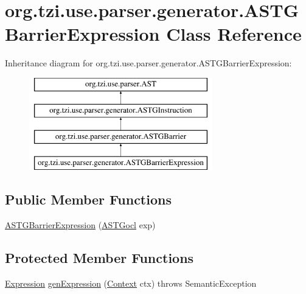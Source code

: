 \hypertarget{classorg_1_1tzi_1_1use_1_1parser_1_1generator_1_1_a_s_t_g_barrier_expression}{\section{org.\-tzi.\-use.\-parser.\-generator.\-A\-S\-T\-G\-Barrier\-Expression Class Reference}
\label{classorg_1_1tzi_1_1use_1_1parser_1_1generator_1_1_a_s_t_g_barrier_expression}
}
Inheritance diagram for org.\-tzi.\-use.\-parser.\-generator.\-A\-S\-T\-G\-Barrier\-Expression\-:\begin{figure}[H]
\begin{center}
\leavevmode
\includegraphics[height=4.000000cm]{classorg_1_1tzi_1_1use_1_1parser_1_1generator_1_1_a_s_t_g_barrier_expression}
\end{center}
\end{figure}
\subsection*{Public Member Functions}
\begin{DoxyCompactItemize}
\item 
\hyperlink{classorg_1_1tzi_1_1use_1_1parser_1_1generator_1_1_a_s_t_g_barrier_expression_a4e6dd1d7afd38f58ccb8c5a39e8d5ab7}{A\-S\-T\-G\-Barrier\-Expression} (\hyperlink{classorg_1_1tzi_1_1use_1_1parser_1_1generator_1_1_a_s_t_gocl}{A\-S\-T\-Gocl} exp)
\end{DoxyCompactItemize}
\subsection*{Protected Member Functions}
\begin{DoxyCompactItemize}
\item 
\hyperlink{classorg_1_1tzi_1_1use_1_1uml_1_1ocl_1_1expr_1_1_expression}{Expression} \hyperlink{classorg_1_1tzi_1_1use_1_1parser_1_1generator_1_1_a_s_t_g_barrier_expression_a277fa85de5eb09d031f22a6750074c11}{gen\-Expression} (\hyperlink{classorg_1_1tzi_1_1use_1_1parser_1_1_context}{Context} ctx)  throws Semantic\-Exception 
\end{DoxyCompactItemize}


